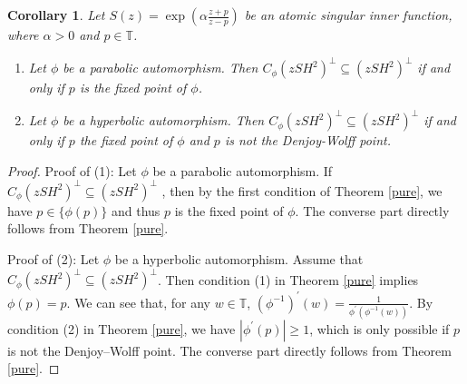 \documentclass[10pt,a4paper]{amsart}
\newtheorem{corollary}{Corollary}
\begin{document}
\begin{corollary}
	Let $S(z)=\exp(\alpha\frac{z+p}{z-p})$ be an atomic singular inner function, where  $\alpha>0$ and $p \in \mathbb{T}$.
	\begin{enumerate}
		\item	Let $\phi$  be a parabolic automorphism. Then $C_\phi(zSH^2)^\perp\subseteq (zSH^2)^\perp$ if and only if
		$p$ is the fixed point of $\phi$.
		\item  Let $\phi$  be a hyperbolic automorphism. Then $C_\phi(zSH^2)^\perp\subseteq (zSH^2)^\perp$ if and only if
		$p$ the fixed point of $\phi$ and $p$ is not the Denjoy-Wolff point.
\end{enumerate}
	
\end{corollary} 

\begin{proof}
	
Proof of (1):	Let $\phi$ be a parabolic automorphism.
	If $C_\phi(zSH^2)^\perp\subseteq (zSH^2)^\perp$ , then by the first condition of Theorem \ref{pure}, we have $p \in \{\phi(p)\}$ and thus $p$ is the fixed point of $\phi$. The converse part directly follows from Theorem \ref{pure}.
	 
Proof of (2):	Let $\phi$ be a hyperbolic automorphism. Assume that $C_\phi(zSH^2)^\perp\subseteq (zSH^2)^\perp$. Then condition (1) in Theorem \ref{pure} implies $\phi(p)=p$. We can see that, for any $w \in \mathbb{T}$, $(\phi^{-1})^{'}(w)=\frac{1}{\phi^{'}(\phi^{-1}(w))}$. By condition (2) in Theorem \ref{pure}, we have 
$|\phi^{'}(p)|\geq 1$, which is only possible if $p$ is not the  Denjoy–Wolff point. The converse part directly follows from Theorem \ref{pure}.

\end{proof}
\end{document}
